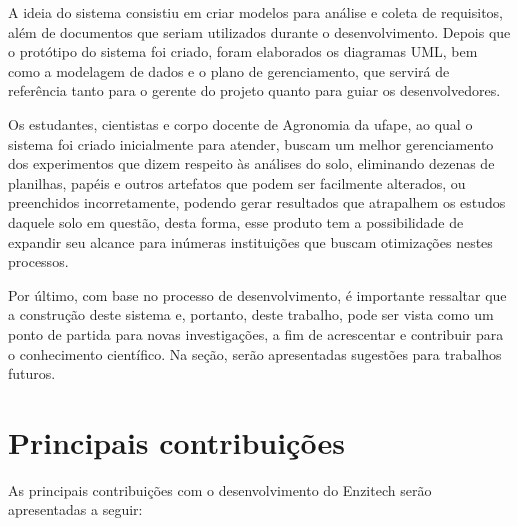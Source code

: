 A ideia do sistema consistiu em criar modelos para análise e coleta de requisitos, além de documentos que seriam utilizados durante o desenvolvimento. Depois que o protótipo do sistema foi criado, foram elaborados os diagramas UML, bem como a modelagem de dados e o plano de gerenciamento, que servirá de referência tanto para o gerente do projeto quanto para guiar os desenvolvedores.

Os estudantes, cientistas e corpo docente de Agronomia da \ac{ufape}, ao qual o sistema foi criado inicialmente para atender, buscam um melhor gerenciamento dos experimentos que dizem respeito às análises do solo, eliminando dezenas de planilhas, papéis e outros artefatos que podem ser facilmente alterados, ou preenchidos incorretamente, podendo gerar resultados que atrapalhem os estudos daquele solo em questão, desta forma, esse produto tem a possibilidade de expandir seu alcance para inúmeras instituições que buscam otimizações nestes processos.

Por último, com base no processo de desenvolvimento, é importante ressaltar que a construção deste sistema e, portanto, deste trabalho, pode ser vista como um ponto de partida para novas investigações, a fim de acrescentar e contribuir para o conhecimento científico. Na seção, serão apresentadas sugestões para trabalhos futuros.

\section{Principais contribuições}\label{sec:contribuicoes}
As principais contribuições com o desenvolvimento do Enzitech serão apresentadas a seguir:

